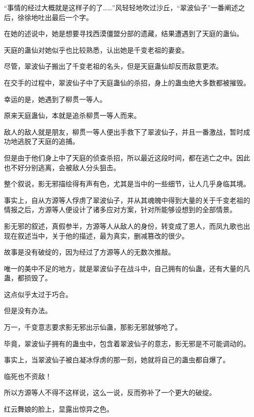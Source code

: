 
\begin{this_body}



“事情的经过大概就是这样子的了……”风轻轻地吹过沙丘，“翠波仙子”一番阐述之后，徐徐地吐出最后一个字。

在她的述说中，她是想要寻找西漠僵盟分部的遗藏，结果遭遇到了天庭的蛊仙。

天庭的蛊仙对她似乎也比较熟悉，认出她是千变老祖的妻妾。

尽管，翠波仙子搬出了千变老祖的名头，但是天庭蛊仙却反而敌意更浓。

在交手的过程中，翠波仙子中了天庭蛊仙的杀招，身上的蛊虫绝大多数都被摧毁。

幸运的是，她遇到了柳贯一等人。

原来天庭蛊仙，本就是追杀柳贯一等人而来。

敌人的敌人就是朋友，柳贯一等人便出手救下了翠波仙子，并且一番激战，暂时成功地逃脱了天庭的追捕。

但是由于他们身上中了天庭的侦查杀招，所以最近这段时间，都在逃亡之中。因此也不好分别逃离，会被敌人分头狙击。

整个叙说，影无邪描绘得有声有色，尤其是当中的一些细节，让人几乎身临其境。

事实上，自从方源等人俘虏了翠波仙子，并从其魂魄中得到大量的关于千变老祖的情报之后，方源等人便设计了诸多应对方案，针对所能够设想到的全部情景。

影无邪的叙述，真假参半，方源等人从敌人的身份，转变成了恩人，而凤九歌也出现在叙述当中，关于他的描述，最为真实，删减篡改的很少。

故事是没有破绽的，因为经过了方源等人的无数次推敲。

唯一的美中不足的地方，就是翠波仙子在战斗中，自己拥有的仙蛊，还有大量的凡蛊，都损毁了。

这点似乎太过于巧合。

但是没有办法。

万一，千变意志要求影无邪出示仙蛊，那影无邪就够呛了。

毕竟，翠波仙子拥有的蛊虫中，包含着翠波仙子的意志，影无邪是不可能调动的。

事实上，当翠波仙子被白凝冰俘虏的那一刻，她就将自己的蛊虫都自爆了。

临死也不资敌！

所以方源等人不得不这样说，这么一说，反而弥补了一个更大的破绽。

红云舞娘的脸上，显露出惊异之色。


\end{this_body}
